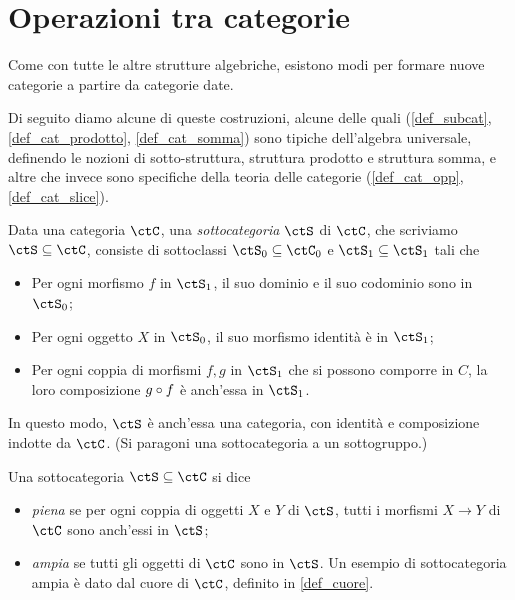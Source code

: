 \section{Operazioni tra categorie}\label{sec_operazioni}
Come con tutte le altre strutture algebriche, esistono modi per formare nuove categorie a partire da categorie date.

Di seguito diamo alcune di queste costruzioni, alcune delle quali (\ref{def_subcat}, \ref{def_cat_prodotto}, \ref{def_cat_somma}) sono tipiche dell'algebra universale, definendo le nozioni di sotto-struttura, struttura prodotto e struttura somma, e altre che invece sono specifiche della teoria delle categorie (\ref{def_cat_opp}, \ref{def_cat_slice}).

\begin{definition}\label{def_subcat}
	Data una categoria \(\ctC\), una \emph{sottocategoria} \(\ctS\) di \(\ctC\), che scriviamo \(\ctS\subseteq \ctC\), consiste di sottoclassi \(\ctS_0\subseteq\ctC_0\) e \(\ctS_1\subseteq\ctS_1\) tali che
	\begin{itemize}
		\item Per ogni morfismo \(f\) in \(\ctS_1\), il suo dominio e il suo codominio sono in \(\ctS_0\);
		\item Per ogni oggetto \(X\) in \(\ctS_0\), il suo morfismo identità è in \(\ctS_1\);
		\item Per ogni coppia di morfismi \(f,g\) in \(\ctS_1\) che si possono comporre in \(C\), la loro composizione \(g\circ f\) è anch'essa in \(\ctS_1\).
	\end{itemize}
	In questo modo, \(\ctS\) è anch'essa una categoria, con identità e composizione indotte da \(\ctC\). (Si paragoni una sottocategoria a un sottogruppo.)

	Una sottocategoria \(\ctS\subseteq \ctC\) si dice
	\begin{itemize}
		\item \emph{piena} se per ogni coppia di oggetti \(X\) e \(Y\) di \(\ctS\), tutti i morfismi \(X\to Y\) di \(\ctC\) sono anch'essi in \(\ctS\);
		\item \emph{ampia} se tutti gli oggetti di \(\ctC\) sono in \(\ctS\). Un esempio di sottocategoria	ampia è dato dal cuore di \(\ctC\), definito in \ref{def_cuore}.
	\end{itemize}
\end{definition}
